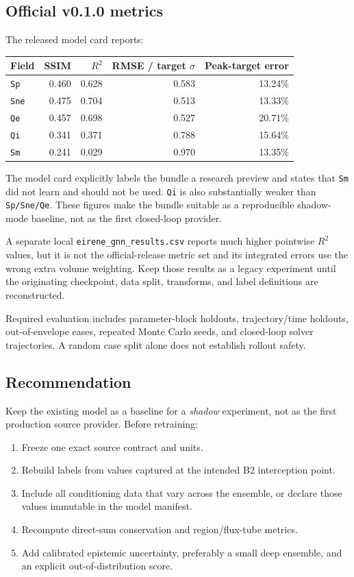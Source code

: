 \documentclass[11pt]{article}
\begin{document}
\subsection{Official v0.1.0 metrics}

The released model card reports:

\begin{center}
\begin{tabular}{lrrrr}
\toprule
Field & SSIM & $R^2$ & RMSE / target $\sigma$ & Peak-target error \\
\midrule
\texttt{Sp}  & 0.460 & 0.628 & 0.583 & 13.24\% \\
\texttt{Sne} & 0.475 & 0.704 & 0.513 & 13.33\% \\
\texttt{Qe}  & 0.457 & 0.698 & 0.527 & 20.71\% \\
\texttt{Qi}  & 0.341 & 0.371 & 0.788 & 15.64\% \\
\texttt{Sm}  & 0.241 & 0.029 & 0.970 & 13.35\% \\
\bottomrule
\end{tabular}
\end{center}

The model card explicitly labels the bundle a research preview and states that \texttt{Sm} did not learn and should not be used. \texttt{Qi} is also substantially weaker than \texttt{Sp/Sne/Qe}. These figures make the bundle suitable as a reproducible shadow-mode baseline, not as the first closed-loop provider.

A separate local \texttt{eirene\_gnn\_results.csv} reports much higher pointwise $R^2$ values, but it is not the official-release metric set and its integrated errors use the wrong extra volume weighting. Keep those results as a legacy experiment until the originating checkpoint, data split, transforms, and label definitions are reconstructed.

Required evaluation includes parameter-block holdouts, trajectory/time holdouts, out-of-envelope cases, repeated Monte Carlo seeds, and closed-loop solver trajectories. A random case split alone does not establish rollout safety.

\subsection{Recommendation}

Keep the existing model as a baseline for a \emph{shadow} experiment, not as the first production source provider. Before retraining:

\begin{enumerate}
\item Freeze one exact source contract and units.
\item Rebuild labels from values captured at the intended B2 interception point.
\item Include all conditioning data that vary across the ensemble, or declare those values immutable in the model manifest.
\item Recompute direct-sum conservation and region/flux-tube metrics.
\item Add calibrated epistemic uncertainty, preferably a small deep ensemble, and an explicit out-of-distribution score.
\end{enumerate}
\end{document}
